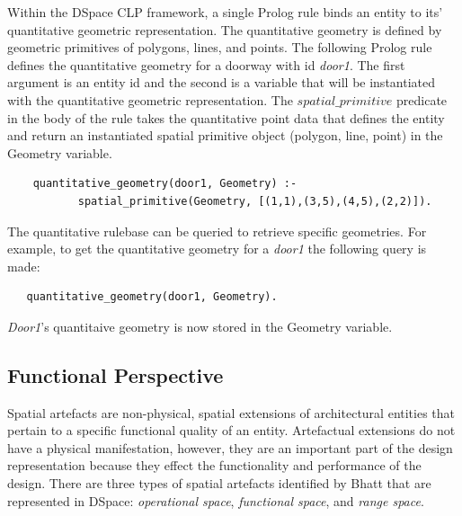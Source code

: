 \documentclass[12pt]{ucthesis}
\begin{document}
Within the DSpace CLP framework, a single Prolog rule binds an entity to its' quantitative geometric representation. The quantitative geometry is defined by geometric primitives of polygons, lines, and points. The following Prolog rule defines the quantitative geometry for a doorway with id \emph{door1}. The first argument is an entity id and the second is a variable that will be instantiated with the quantitative geometric representation. The $spatial\_primitive$ predicate in the body of the rule takes the quantitative point data that defines the entity and return an instantiated spatial primitive object (polygon, line, point) in the Geometry variable.
\begin{verbatim}
    quantitative_geometry(door1, Geometry) :-
           spatial_primitive(Geometry, [(1,1),(3,5),(4,5),(2,2)]).
\end{verbatim}

The quantitative rulebase can be queried to retrieve specific geometries. For example, to get the quantitative geometry for a \emph{door1} the following query is made:
\begin{verbatim}
   quantitative_geometry(door1, Geometry).
\end{verbatim} 
\emph{Door1}'s quantitaive geometry is now stored in the Geometry variable.


\subsection{Functional Perspective}
Spatial artefacts are non-physical, spatial extensions of architectural entities that pertain to a specific functional quality of an entity. Artefactual extensions do not have a physical manifestation, however, they are an important part of the design representation because they effect the functionality and performance of the design. There are three types of spatial artefacts identified by Bhatt\cite{Bhatt} that are represented in DSpace: \emph{operational space}, \emph{functional space}, and \emph{range space}.
\end{document}
